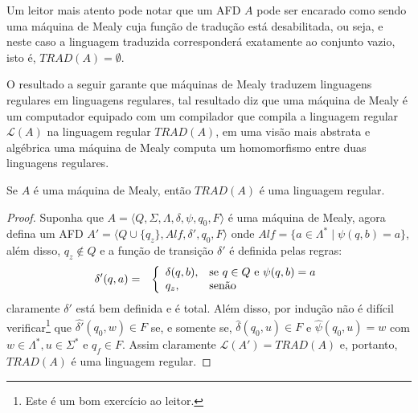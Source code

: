 
\begin{remark}
	Um leitor mais atento pode notar que um AFD $A$ pode ser encarado como sendo uma máquina de Mealy cuja função de tradução está desabilitada, ou seja,  e neste caso a linguagem traduzida corresponderá exatamente ao conjunto vazio, isto é, $TRAD(A) = \emptyset$.
\end{remark}

O resultado a seguir garante que máquinas de Mealy traduzem linguagens regulares em linguagens regulares,  tal resultado diz que uma máquina de Mealy é um computador equipado com um compilador que compila a linguagem regular $\mathcal{L}(A)$ na  linguagem regular $TRAD(A)$, em uma visão mais abstrata e algébrica uma máquina de Mealy computa um homomorfismo entre duas linguagens regulares.

\begin{theorem}\label{teo:TraducaoRegular}
	Se $A$ é uma máquina de Mealy, então $TRAD(A)$ é uma linguagem regular.
\end{theorem}

\begin{proof}
	Suponha que  $A = \langle Q, \Sigma, \Lambda, \delta, \psi, q_0, F\rangle$ é uma máquina de Mealy, agora defina um AFD $A' = \langle Q \cup \{q_z\}, Alf, \delta', q_0, F \rangle$ onde $Alf = \{a \in \Lambda^* \mid \psi(q, b) = a\}$, além disso, $q_z \notin Q$ e a função de transição $\delta'$ é definida pelas regras: 
	\begin{eqnarray*}
		\delta'(q, a) & = & \left\{\begin{array}{ll}	\delta(q, b) , & \hbox{se } q \in Q \text{ e } \psi(q, b) = a\\	q_z,  & \hbox{senão}\end{array}\right.
	\end{eqnarray*}
	claramente $\delta'$ está bem definida e é total. Além disso, por indução não é difícil verificar\footnote{Este é um bom exercício ao leitor.} que $\widehat{\delta'}(q_0, w) \in F$ se, e somente se, $\widehat{\delta}(q_0, u) \in F$ e $\widehat{\psi}(q_0, u) = w$ com $w \in \Lambda^*, u \in \Sigma^*$ e $q_f \in F$. Assim claramente $\mathcal{L}(A') = TRAD(A)$ e, portanto, $TRAD(A)$ é uma linguagem regular.
\end{proof}

